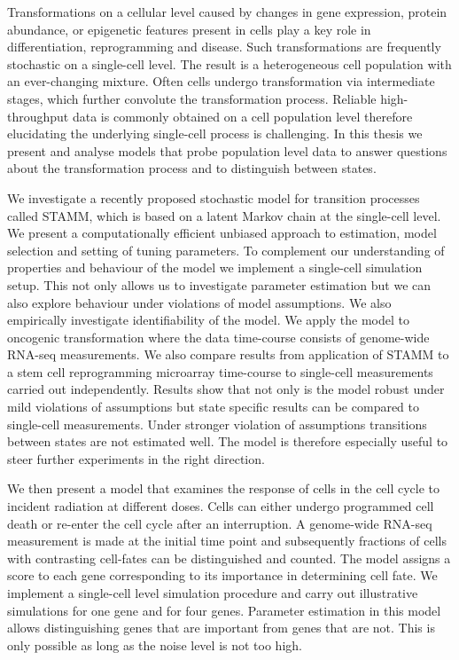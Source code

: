
\vspace{-1.5cm}
Transformations on a cellular level caused by changes in gene expression, protein abundance, or epigenetic features present in cells play a key role in differentiation, reprogramming and disease. Such transformations are frequently stochastic on a single-cell level. The result is a heterogeneous cell population with an ever-changing mixture. Often cells undergo transformation via intermediate stages, which further  convolute the transformation process. Reliable high-throughput data is commonly obtained on a cell population level therefore elucidating the underlying single-cell process is challenging. In this thesis we present and analyse models that probe population level data to answer questions about the transformation process and to distinguish between states.

We investigate a recently proposed stochastic model for transition processes called STAMM, which is based on a latent Markov chain at the single-cell level. We present a computationally efficient unbiased approach to estimation, model selection and setting of tuning parameters. To complement our understanding of properties and behaviour of the model we implement a single-cell simulation setup. This not only allows us to investigate parameter estimation but we can also explore behaviour under violations of model assumptions. We also empirically investigate identifiability of the model. We apply the model to oncogenic transformation where the data time-course consists of genome-wide RNA-seq measurements. We also compare results from application of STAMM to a stem cell reprogramming microarray time-course to single-cell measurements carried out independently. Results show that not only is the model robust under mild violations of assumptions but state specific results can be compared to single-cell measurements. Under stronger violation of assumptions transitions between states are not estimated well. The model is therefore especially useful to steer further experiments in the right direction.

We then present  a model that examines the response of cells in the cell cycle to incident radiation at different doses. Cells can either undergo programmed cell death or re-enter the cell cycle after an interruption. A genome-wide RNA-seq measurement is made at the initial time point and subsequently fractions of cells with contrasting cell-fates can be distinguished and counted. The model assigns a score to each gene corresponding to its importance in determining cell fate. We implement a single-cell level simulation procedure and carry out illustrative simulations for one gene and for four genes. Parameter estimation in this model allows distinguishing genes that are important from genes that are not. This is only possible as long as the noise level is not too high.


